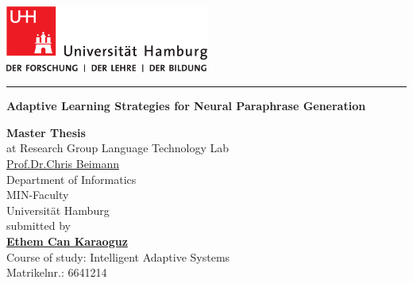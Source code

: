 \documentclass[12pt,final,twoside]{report}
\author{\trauthor}
\makeatletter
\newcommand{\trtitle}{Adaptive Learning Strategies for Neural Paraphrase Generation}
\newcommand{\trtype}{Master Thesis} %
\newcommand{\trcourseofstudies}{Intelligent Adaptive Systems} %
\newcommand{\trauthor}{Ethem Can Karaoguz}
\newcommand{\trauthordegree}{} %
\newcommand{\tremail}{4karaoguz@informatik.uni-hamburg.de}
\newcommand{\trmatrikelnummer}{6641214}
\newcommand{\trgutachterA}{\href{mailto:beimann@informatik.uni-hamburg.de}{Prof.Dr.Chris Beimann}}
\newcommand{\trfach}{Language Technology Lab}
\theoremstyle{plain}
\theoremstyle{definition}
\theoremstyle{remark}
\makeatother
\begin{document}
\renewcommand{\headheight}{14.5pt}      %

\thispagestyle{empty}
\fancyhead[LO,RE]{}                     %


\begin{titlepage}
    \begin{flushleft}
        \includegraphics[width=67mm, scale =1.5]{uhhLogoL.pdf}\\
    \end{flushleft}
    \rule{\textwidth}{0.4pt}
        \newline
        \vspace{2.0cm}
        \begin{center}
          \LARGE \textbf{\trtitle}
        \end{center}
    \vspace{2.0cm}
    \begin{center}
      \textbf{\trtype}\\
      at Research Group \trfach\\
      \trgutachterA\medskip\\
      Department of Informatics\\
      MIN-Faculty\\
      Universit\"at Hamburg \\[1.0cm] %
      submitted by \\
      \textbf{\href{mailto:\tremail}{\trauthor\trauthordegree}}\\
      Course of study:   \trcourseofstudies \\
      Matrikelnr.:  \trmatrikelnummer \\

\end{center}
\end{titlepage}
\end{document}
